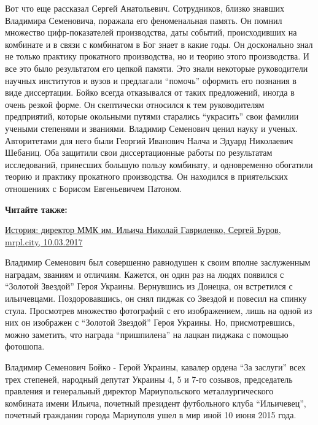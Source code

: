 Вот что еще рассказал Сергей Анатольевич. Сотрудников, близко знавших Владимира
Семеновича, поражала его феноменальная память. Он помнил множество
цифр-показателей производства, даты событий, происходивших на комбинате и в
связи с комбинатом в Бог знает в какие годы. Он досконально знал не только
практику прокатного производства, но и теорию этого производства. И все это
было результатом его цепкой памяти. Это знали некоторые руководители научных
институтов и вузов и предлагали \enquote{помочь} оформить его познания в виде
диссертации. Бойко всегда отказывался от таких предложений, иногда в очень
резкой форме. Он скептически относился к тем руководителям предприятий, которые
окольными путями старались \enquote{украсить} свои фамилии учеными степенями и
званиями. Владимир Семенович ценил науку и ученых. Авторитетами для него были
Георгий Иванович Налча и Эдуард Николаевич Шебаниц. Оба защитили свои
диссертационные работы по результатам  исследований, принесших большую пользу
комбинату, и одновременно обогатили теорию и практику прокатного производства.
Он находился в приятельских отношениях с Борисом Евгеньевичем Патоном.

\textbf{Читайте также:} 

\href{https://archive.org/details/10_03_2017.sergij_burov.mrpl_city.istoria_direktor_mmk_im_iljicha_nikolaj_gavrilenko}{%
История: директор ММК им. Ильича Николай Гавриленко, Сергей Буров, mrpl.city, 10.03.2017}

Владимир Семенович был совершенно равнодушен к своим вполне заслуженным
наградам, званиям и отличиям. Кажется, он один раз на людях появился с \enquote{Золотой
Звездой} Героя Украины. Вернувшись из Донецка, он встретился с ильичевцами.
Поздоровавшись, он снял пиджак со Звездой и повесил на спинку стула. Просмотрев
множество фотографий с его изображением, лишь на одной из них он изображен с
\enquote{Золотой Звездой} Героя Украины. Но, присмотревшись, можно заметить, что
награда \enquote{пришпилена} на лацкан пиджака с помощью фотошопа.

Владимир Семенович Бойко - Герой Украины, кавалер ордена \enquote{За заслуги} всех трех
степеней, народный депутат Украины 4, 5 и 7-го созывов, председатель правления
и генеральный директор Мариупольского металлургического комбината имени Ильича,
почетный президент футбольного клуба \enquote{Ильичевец}, почетный гражданин города
Мариуполя ушел в мир иной 10 июня 2015 года.
